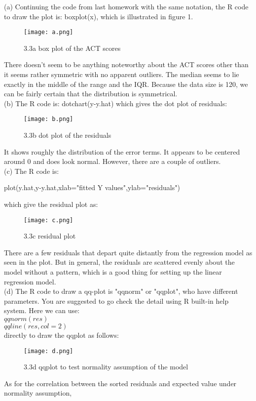 \documentclass[12pt]{article}
\begin{document}
 { \vfill
  \answer
} { (a) Continuing the code from last homework with the same
notation, the R code to draw the plot is: boxplot(x), which is illustrated in figure 1.
\begin{figure}[h!]
  \caption{3.3a box plot of the ACT scores}
  \centering
    \texttt{[image: a.png]}
\end{figure}
There doesn't seem to be anything noteworthy about the ACT scores other than it seems rather symmetric with no apparent outliers. The median seems to lie exactly in the middle of the range and the IQR.
Because the data size is 120, we can be fairly certain that the distribution is symmetrical.\\
(b) The R code is: dotchart(y-y.hat) which gives the dot plot of
residuals:
\begin{figure}[h!]
  \caption{3.3b dot plot of the residuals}
  \centering
     \texttt{[image: b.png]}
\end{figure}
It shows roughly the distribution of the error terms. It appears to be centered around 0 and does look normal. However, there are a couple of outliers.\\
(c) The R code is:\\
\begin{center}
plot(y.hat,y-y.hat,xlab="fitted Y values",ylab="residuals")
\end{center}
which give the residual plot as:
\begin{figure}[h!]
  \caption{3.3c residual plot}
  \centering
     \texttt{[image: c.png]}
\end{figure}
There are a few residuals that depart quite distantly from the
regression model as seen in the plot. But in general, the residuals
are scattered evenly about the model without a pattern, which is a
good thing for
setting up the linear regression model.\\
(d) The R code to draw a qq-plot is "qqnorm" or "qqplot", who have
different parameters. You are suggested to go check the detail using
R built-in help system.
Here we can use:\\
$qqnorm(res)$\\
$qqline(res,col=2)$\\
directly to draw the qqplot as follows:
\begin{figure}[h!]
  \caption{3.3d qqplot to test normality assumption of the model}
  \centering
     \texttt{[image: d.png]}
\end{figure}
As for the correlation between the sorted residuals and expected value under normality assumption,
}
\end{document}
